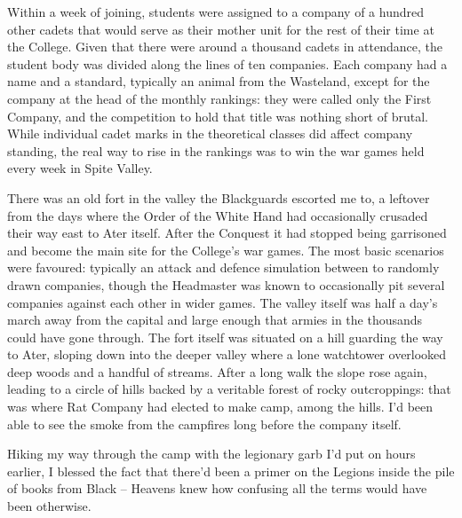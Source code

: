 \documentclass[12pt, openany]{book}
\begin{document}
Within a week of joining, students were assigned to a company of a hundred other cadets that would serve as their mother unit for the rest of their time at the College. Given that there were around a thousand cadets in attendance, the student body was divided along the lines of ten companies. Each company had a name and a standard, typically an animal from the Wasteland, except for the company at the head of the monthly rankings: they were called only the First Company, and the competition to hold that title was nothing short of brutal. While individual cadet marks in the theoretical classes did affect company standing, the real way to rise in the rankings was to win the war games held every week in Spite Valley. 

There was an old fort in the valley the Blackguards escorted me to, a leftover from the days where the Order of the White Hand had occasionally crusaded their way east to Ater itself. After the Conquest it had stopped being garrisoned and become the main site for the College’s war games. The most basic scenarios were favoured: typically an attack and defence simulation between to randomly drawn companies, though the Headmaster was known to occasionally pit several companies against each other in wider games. The valley itself was half a day’s march away from the capital and large enough that armies in the thousands could have gone through. The fort itself was situated on a hill guarding the way to Ater, sloping down into the deeper valley where a lone watchtower overlooked deep woods and a handful of streams. After a long walk the slope rose again, leading to a circle of hills backed by a veritable forest of rocky outcroppings: that was where Rat Company had elected to make camp, among the hills. I’d been able to see the smoke from the campfires long before the company itself.

Hiking my way through the camp with the legionary garb I’d put on hours earlier, I blessed the fact that there’d been a primer on the Legions inside the pile of books from Black – Heavens knew how confusing all the terms would have been otherwise. 
\end{document}
